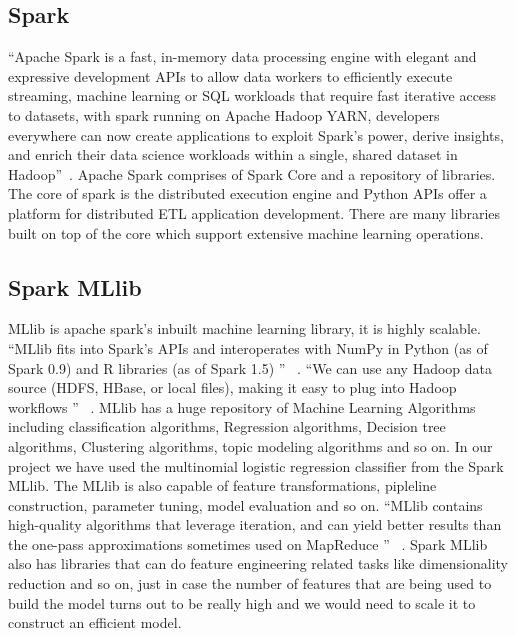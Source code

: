 \subsection{Spark}
``Apache Spark is a fast, in-memory data processing engine with elegant and expressive 
development APIs to allow data workers to efficiently execute streaming, machine 
learning or SQL workloads that require fast iterative 
access to datasets, with spark running on Apache Hadoop YARN, developers 
everywhere can now create applications to exploit Spark’s power, derive 
insights, and enrich their data science workloads within a single, 
shared dataset in Hadoop''~\cite{hid-sp18-418-spark}. Apache Spark comprises 
of Spark Core and a repository of libraries. The core of spark is the 
distributed execution engine and Python APIs offer a platform for distributed 
ETL application development. There are many libraries built on top of the 
core which support extensive machine learning operations.

\subsection{Spark MLlib}
MLlib is apache spark's inbuilt machine learning library, it is highly scalable. 
``MLlib fits into Spark's APIs and interoperates 
with NumPy in Python (as of Spark 0.9) and R 
libraries (as of Spark 1.5) '' ~\cite{hid-sp18-418-sparkml}.
``We can use any Hadoop data source (HDFS, HBase, or local files), 
making it easy to plug into Hadoop workflows '' ~\cite{hid-sp18-418-sparkml}. 
MLlib has a huge repository of Machine Learning Algorithms including 
classification algorithms, Regression algorithms, 
Decision tree algorithms, Clustering algorithms, topic modeling algorithms and 
so on. In our project we have used the multinomial 
logistic regression classifier from the Spark MLlib. The MLlib 
is also capable of feature transformations, pipleline 
construction, parameter tuning, model evaluation and 
so on. ``MLlib contains high-quality algorithms that leverage iteration, 
and can yield better results than the one-pass approximations sometimes used 
on MapReduce '' ~\cite{hid-sp18-418-sparkml}. Spark MLlib also has 
libraries that can do feature engineering related tasks like dimensionality 
reduction and so on, just in case the number of features that are being 
used to build the model turns out to be really high and we would need to scale 
it to construct an efficient model.

